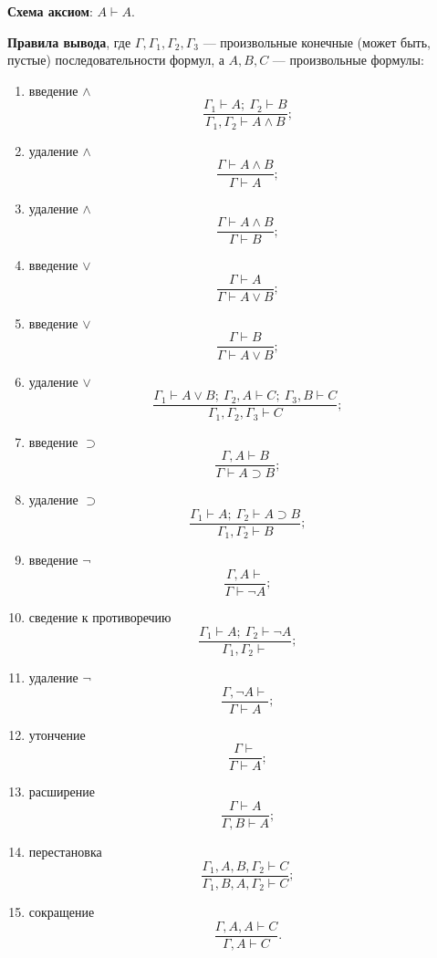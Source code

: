 \textbf{Схема аксиом}: $A \vdash A$.

\textbf{Правила вывода}, где $\Gamma, \Gamma_1, \Gamma_2, \Gamma_3$ --- произвольные конечные (может быть, пустые) последовательности формул, а $A, B, C$ --- произвольные формулы:
\begin{enumerate}[label=\arabic*)]
    \item введение $\land$
    \[
        \frac{\Gamma_1 \vdash A;\ \Gamma_2 \vdash B}{\Gamma_1, \Gamma_2 \vdash A \land B};
    \]
    \item удаление $\land$
    \[
        \frac{\Gamma \vdash A \land B}{\Gamma \vdash A};
    \]
    \item удаление $\land$
    \[
        \frac{\Gamma \vdash A \land B}{\Gamma \vdash B};
    \]
    \item введение $\lor$
    \[
        \frac{\Gamma \vdash A}{\Gamma \vdash A \lor B};
    \]
    \item введение $\lor$
    \[
        \frac{\Gamma \vdash B}{\Gamma \vdash A \lor B};
    \]
    \item удаление $\lor$
    \[
        \frac{\Gamma_1 \vdash A \lor B;\ \Gamma_2, A \vdash C;\ \Gamma_3, B \vdash C}{\Gamma_1, \Gamma_2, \Gamma_3 \vdash C};
    \]
    \item введение $\supset$
    \[
        \frac{\Gamma, A \vdash B}{\Gamma \vdash A \supset B};
    \]
    \item удаление $\supset$
    \[
        \frac{\Gamma_1 \vdash A;\ \Gamma_2 \vdash A \supset B}{\Gamma_1, \Gamma_2 \vdash B};
    \]
    \item введение $\neg$
    \[
        \frac{\Gamma, A \vdash}{\Gamma \vdash \neg A};
    \]
    \item сведение к противоречию
    \[
        \frac{\Gamma_1 \vdash A;\ \Gamma_2 \vdash \neg A}{\Gamma_1, \Gamma_2 \vdash};
    \]
    \item удаление $\neg$
    \[
        \frac{\Gamma, \neg A \vdash}{\Gamma \vdash A};
    \]
    \item утончение
    \[
        \frac{\Gamma \vdash}{\Gamma \vdash A};
    \]
    \item расширение
    \[
        \frac{\Gamma \vdash A}{\Gamma, B \vdash A};
    \]
    \item перестановка
    \[
        \frac{\Gamma_1, A, B, \Gamma_2 \vdash C}{\Gamma_1, B, A, \Gamma_2 \vdash C};
    \]
    \item сокращение
    \[
        \frac{\Gamma, A, A \vdash C}{\Gamma, A \vdash C}.
    \]
\end{enumerate}

